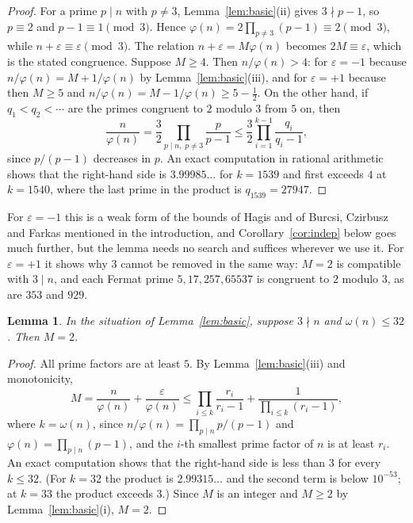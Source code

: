 \documentclass[11pt,reqno]{amsart}
\numberwithin{equation}{section}
\theoremstyle{plain}
\newtheorem{lemma}[theorem]{Lemma}
\theoremstyle{definition}
\theoremstyle{remark}
\begin{document}
\begin{proof}
For a prime $p\mid n$ with $p\ne3$, Lemma~\ref{lem:basic}(ii) gives
$3\nmid p-1$, so $p\equiv2$ and $p-1\equiv1\pmod 3$. Hence
$\varphi(n)=2\prod_{p\ne3}(p-1)\equiv2\pmod3$, while
$n+\varepsilon\equiv\varepsilon\pmod 3$. The relation
$n+\varepsilon=M\varphi(n)$ becomes $2M\equiv\varepsilon$, which is
the stated congruence. Suppose $M\ge4$. Then $n/\varphi(n)>4$: for
$\varepsilon=-1$ because $n/\varphi(n)=M+1/\varphi(n)$ by
Lemma~\ref{lem:basic}(iii), and for $\varepsilon=+1$ because then
$M\ge5$ and $n/\varphi(n)=M-1/\varphi(n)\ge5-\tfrac12$. On the other hand, if $q_1<q_2<\cdots$ are the
primes congruent to $2$ modulo $3$ from $5$ on, then
\[
  \frac{n}{\varphi(n)}=\frac32\prod_{p\mid n,\;p\ne3}\frac{p}{p-1}
  \le\frac32\prod_{i=1}^{k-1}\frac{q_i}{q_i-1},
\]
since $p/(p-1)$ decreases in $p$. An exact computation in rational
arithmetic shows that the right-hand side is $3.99985\ldots$ for
$k=1539$ and first exceeds $4$ at $k=1540$, where the last prime in the
product is $q_{1539}=27947$.
\end{proof}

For $\varepsilon=-1$ this is a weak form of the bounds of Hagis and of
Burcsi, Czirbusz and Farkas mentioned in the introduction, and
Corollary~\ref{cor:indep} below goes much further, but the lemma needs
no search and suffices wherever we use it. For $\varepsilon=+1$ it
shows why $3$ cannot be
removed in the same way: $M=2$ is compatible with $3\mid n$, and each
Fermat prime $5,17,257,65537$ is congruent to $2$ modulo $3$, as are
$353$ and $929$.

\begin{lemma}\label{lem:Mtwo}
In the situation of Lemma~\ref{lem:basic}, suppose $3\nmid n$ and
$\omega(n)\le32$. Then $M=2$.
\end{lemma}

\begin{proof}
All prime factors are at least $5$. By Lemma~\ref{lem:basic}(iii)
and monotonicity,
\[
  M=\frac{n}{\varphi(n)}+\frac{\varepsilon}{\varphi(n)}
  \le\prod_{i\le k}\frac{r_i}{r_i-1}+\frac{1}{\prod_{i\le k}(r_i-1)} ,
\]
where $k=\omega(n)$, since $n/\varphi(n)=\prod_{p\mid n}p/(p-1)$ and
$\varphi(n)=\prod_{p\mid n}(p-1)$, and the $i$-th smallest prime factor
of $n$ is at least $r_i$. An exact computation shows that the
right-hand side is less than $3$ for every $k\le32$. (For $k=32$ the
product is $2.99315\ldots$ and the second term is below $10^{-53}$; at
$k=33$ the product exceeds $3$.) Since $M$ is an integer and $M\ge2$
by Lemma~\ref{lem:basic}(i), $M=2$.
\end{proof}
\end{document}
